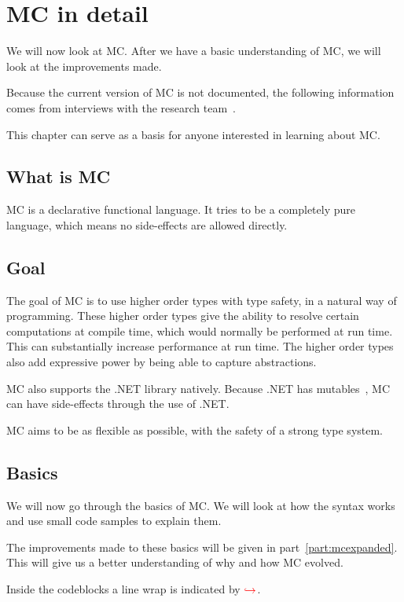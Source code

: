 \chapter{MC in detail}
We will now look at MC.
After we have a basic understanding of MC, we will look at the improvements made.

Because the current version of MC is not documented, the following information comes from interviews with the research team~\cite{researchteaminterview}.

This chapter can serve as a basis for anyone interested in learning about MC.


\section{What is MC}
MC is a declarative functional language.
It tries to be a completely pure language, which means no side-effects are allowed directly.


\section{Goal}
The goal of MC is to use higher order types with type safety, in a natural way of programming.
These higher order types give the ability to resolve certain computations at compile time, which would normally be performed at run time.
This can substantially increase performance at run time.
The higher order types also add expressive power by being able to capture abstractions.

MC also supports the .NET library natively.
Because .NET has mutables~\cite{dotnetdescription}, MC can have side-effects through the use of .NET.

MC aims to be as flexible as possible, with the safety of a strong type system.


\section{Basics}
We will now go through the basics of MC.
We will look at how the syntax works and use small code samples to explain them.

The improvements made to these basics will be given in part~\ref{part:mcexpanded}.
This will give us a better understanding of why and how MC evolved.

Inside the codeblocks a line wrap is indicated by \ensuremath{\color{red}\hookrightarrow\space}.


